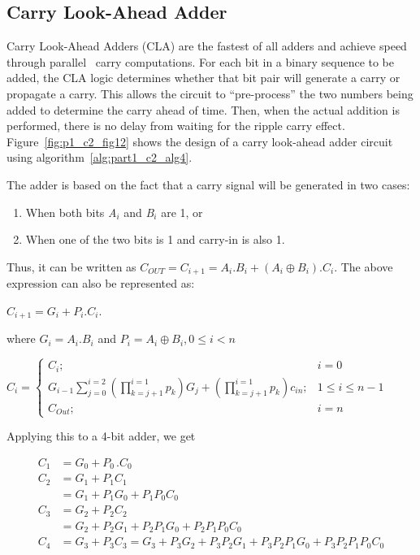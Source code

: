 \subsection{Carry Look-Ahead Adder}
Carry Look-Ahead Adders (CLA) are the fastest of all adders and achieve speed through parallel~ carry computations. For each bit in a binary sequence to be added, the CLA logic determines whether that bit pair will generate a carry or propagate a carry. This allows the circuit to ``pre-process'' the two numbers being added to determine the carry ahead of time. Then, when the actual addition is performed, there is no delay from waiting for the ripple carry effect. Figure~\ref{fig:p1_c2_fig12} shows the design of a carry look-ahead adder circuit using algorithm~\ref{alg:part1_c2_alg4}.

The adder is based on the fact that a carry signal will be generated in two cases:
\begin{enumerate}
\item When both bits {\it A${}_{i}$} and {\it B${}_{i}$} are 1, or
\item When one of the two bits is 1 and carry-in is also 1.
\end{enumerate}

\noindent Thus, it can be written as
$C{}_{OUT} = C{}_{i + 1} = A{}_{i} . B{}_{i} + (A{}_{i}{\oplus } B{}_{i}) . C{}_{i}$.
\newline The above expression can also be represented as:

$C{}_{i+1} = G{}_{i} + P{}_{i} . C{}_{i}$.

\noindent where $G{}_{i} = A{}_{i} . B{}_{i}$ and $P{}_{i} = A_{i} \oplus B_{i} ,0 \le i < n$

$
C_i=\left\{\begin{matrix}
C_i;& i=0\\
G_{i-1}\sum_{j=0}^{i=2}\left ( \prod_{k=j+1}^{i=1}p_k \right )G_j+\left ( \prod_{k=j+1}^{i=1}p_k \right )c_{in};&1\le i\le n-1 \\
C_{Out};& i=n
\end{matrix}\right.
$

\noindent Applying this to a {4}-bit adder, we get



\begin{align*}
C{}_{1} &= G{}_{0} + P{}_{0\ }. C{}_{0}\\
%
C{}_{2} &= G{}_{1} + P{}_{1} C{}_{1}\\
%
&= G{}_{1} + P{}_{1} G{}_{0} + P{}_{1} P{}_{0} C{}_{0}\\
%
C{}_{3} &= G{}_{2} + P{}_{2} C{}_{2}\\
%
&= G{}_{2} + P{}_{2} G{}_{1} + P{}_{2} P{}_{1} G{}_{0} + P{}_{2} P{}_{1} P{}_{0} C{}_{0}\\
%
C{}_{4} &= G{}_{3} + P{}_{3} C{}_{3} = G{}_{3} + P{}_{3} G{}_{2} + P{}_{3} P{}_{2} G{}_{1} + P{}_{3} P{}_{2} P{}_{1} G{}_{0} + P{}_{3} P{}_{2} P{}_{1} P{}_{0} C{}_{0}
\end{align*}


